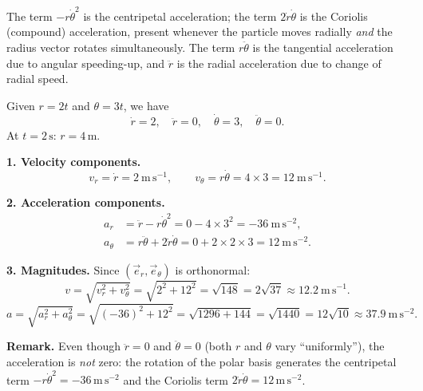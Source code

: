 \documentclass[11pt]{article}
\newcommand{\cle}[1]{{\popxbold\color{popdark}#1}}
\begin{document}
\begin{aretenir}
The term $-r\dot{\theta}^2$ is the \cle{centripetal acceleration}; the term $2\dot{r}\dot{\theta}$ is the \cle{Coriolis (compound) acceleration}, present whenever the particle moves radially \emph{and} the radius vector rotates simultaneously. The term $r\ddot{\theta}$ is the tangential acceleration due to angular speeding-up, and $\ddot{r}$ is the radial acceleration due to change of radial speed.
\end{aretenir}

\begin{corrige}
Given $r = 2t$ and $\theta = 3t$, we have
\[ \dot{r} = 2, \quad \ddot{r} = 0, \quad \dot{\theta} = 3, \quad \ddot{\theta} = 0. \]
At $t = 2\,\mathrm{s}$: $r = 4\,\mathrm{m}$.

\textbf{1. Velocity components.}
\[ v_r = \dot{r} = 2\ \mathrm{m\,s^{-1}}, \qquad v_\theta = r\dot{\theta} = 4 \times 3 = 12\ \mathrm{m\,s^{-1}}. \]

\textbf{2. Acceleration components.}
\begin{align*}
a_r &= \ddot{r} - r\dot{\theta}^2 = 0 - 4 \times 3^2 = -36\ \mathrm{m\,s^{-2}},\\
a_\theta &= r\ddot{\theta} + 2\dot{r}\dot{\theta} = 0 + 2 \times 2 \times 3 = 12\ \mathrm{m\,s^{-2}}.
\end{align*}

\textbf{3. Magnitudes.} Since $(\vec{e}_r, \vec{e}_\theta)$ is orthonormal:
\[ v = \sqrt{v_r^2 + v_\theta^2} = \sqrt{2^2 + 12^2} = \sqrt{148} = 2\sqrt{37} \approx 12.2\ \mathrm{m\,s^{-1}}. \]
\[ a = \sqrt{a_r^2 + a_\theta^2} = \sqrt{(-36)^2 + 12^2} = \sqrt{1296 + 144} = \sqrt{1440} = 12\sqrt{10} \approx 37.9\ \mathrm{m\,s^{-2}}. \]

\textbf{Remark.} Even though $\ddot r = 0$ and $\ddot\theta = 0$ (both $r$ and $\theta$ vary ``uniformly''), the acceleration is \emph{not} zero: the rotation of the polar basis generates the centripetal term $-r\dot\theta^2 = -36\,\mathrm{m\,s^{-2}}$ and the Coriolis term $2\dot r\dot\theta = 12\,\mathrm{m\,s^{-2}}$.
\end{corrige}
\end{document}
